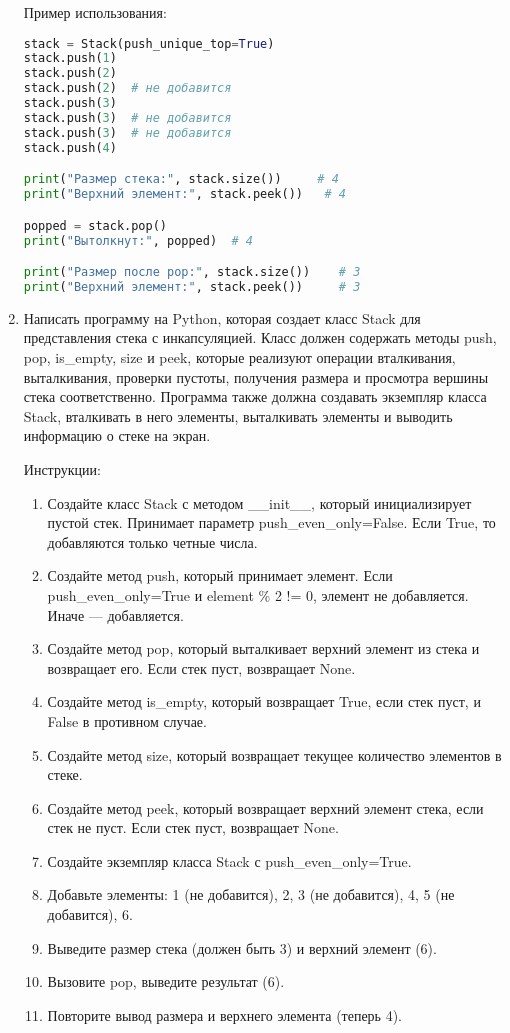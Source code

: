 \begin{enumerate}
Пример использования:
\begin{lstlisting}[language=Python]
stack = Stack(push_unique_top=True)
stack.push(1)
stack.push(2)
stack.push(2)  # не добавится
stack.push(3)
stack.push(3)  # не добавится
stack.push(3)  # не добавится
stack.push(4)

print("Размер стека:", stack.size())     # 4
print("Верхний элемент:", stack.peek())   # 4

popped = stack.pop()
print("Вытолкнут:", popped)  # 4

print("Размер после pop:", stack.size())    # 3
print("Верхний элемент:", stack.peek())     # 3
\end{lstlisting}

\item Написать программу на Python, которая создает класс Stack для представления стека с инкапсуляцией. Класс должен содержать методы push, pop, is\_empty, size и peek, которые реализуют операции вталкивания, выталкивания, проверки пустоты, получения размера и просмотра вершины стека соответственно. Программа также должна создавать экземпляр класса Stack, вталкивать в него элементы, выталкивать элементы и выводить информацию о стеке на экран.

Инструкции:
\begin{enumerate}
    \item Создайте класс Stack с методом \_\_init\_\_, который инициализирует пустой стек. Принимает параметр push\_even\_only=False. Если True, то добавляются только четные числа.
    \item Создайте метод push, который принимает элемент. Если push\_even\_only=True и element \% 2 != 0, элемент не добавляется. Иначе — добавляется.
    \item Создайте метод pop, который выталкивает верхний элемент из стека и возвращает его. Если стек пуст, возвращает None.
    \item Создайте метод is\_empty, который возвращает True, если стек пуст, и False в противном случае.
    \item Создайте метод size, который возвращает текущее количество элементов в стеке.
    \item Создайте метод peek, который возвращает верхний элемент стека, если стек не пуст. Если стек пуст, возвращает None.
    \item Создайте экземпляр класса Stack с push\_even\_only=True.
    \item Добавьте элементы: 1 (не добавится), 2, 3 (не добавится), 4, 5 (не добавится), 6.
    \item Выведите размер стека (должен быть 3) и верхний элемент (6).
    \item Вызовите pop, выведите результат (6).
    \item Повторите вывод размера и верхнего элемента (теперь 4).
\end{enumerate}


\end{enumerate}
